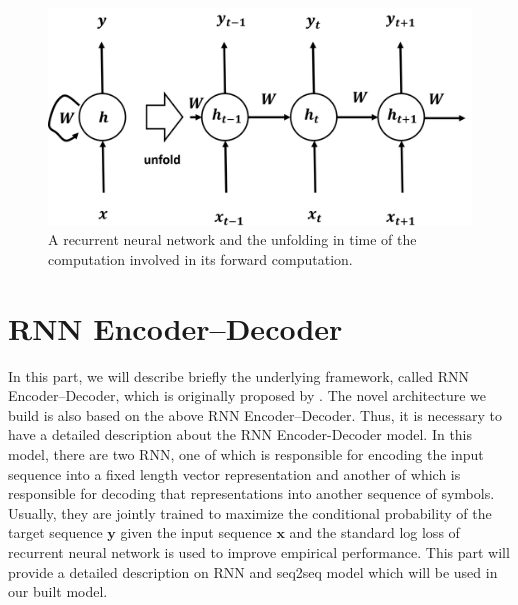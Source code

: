 \begin{figure}[ht]
    \centering
    \includegraphics[width=\textwidth]{RNN.png}
    \caption{A recurrent neural network and the unfolding in time of the computation involved in its forward computation.}
    \label{fig:4}
\end{figure}

\section{RNN Encoder–Decoder}

In this part, we will describe briefly the underlying framework, called RNN Encoder–Decoder, which is originally proposed by \cite{cho2014learning,sutskever2014sequence}. The novel architecture we build is also based on the above RNN Encoder–Decoder. Thus, it is necessary to have a detailed description about the RNN Encoder-Decoder model. In this model, there are two RNN, one of which is responsible for encoding the input sequence into a fixed length vector representation and another of which is responsible for decoding that representations into another sequence of symbols. Usually, they are jointly trained to maximize the conditional probability of the target sequence $\mathbf{y}$ given the input sequence $\mathbf{x}$ and the standard log loss of recurrent neural network is used to improve empirical performance. This part will provide a detailed description on RNN and seq2seq model which will be used in our built model.

